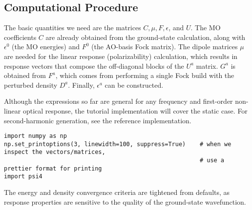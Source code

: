 \hypertarget{computational-procedure}{%
  \subsection{Computational Procedure}\label{computational-procedure}}

The basic quantities we need are the matrices \(C, \mu, F, \epsilon\), and \(U\). The MO coefficients \(C\) are already obtained from the ground-state calculation, along with \(\epsilon^{0}\) (the MO energies) and \(F^{0}\) (the AO-basis Fock matrix). The dipole matrices \(\mu\) are needed for the linear response (polarizability) calculation, which results in response vectors that compose the off-diagonal blocks of the \(U^{a}\) matrix. \(G^{a}\) is obtained from \(F^{a}\), which comes from performing a single Fock build with the perturbed density \(D^{a}\).  Finally, \(\epsilon^{a}\) can be constructed.

Although the expressions so far are general for any frequency and first-order non-linear optical response, the tutorial implementation will cover the static case. For second-harmonic generation, see the reference implementation.

\begin{verbatim}
import numpy as np
np.set_printoptions(3, linewidth=100, suppress=True)    # when we inspect the vectors/matrices,
                                                        # use a prettier format for printing
import psi4
\end{verbatim}
The energy and density convergence criteria are tightened from defaults, as response properties are sensitive to the quality of the ground-state wavefunction.

